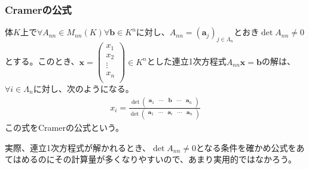 \documentclass[dvipdfmx]{jsarticle}
\begin{document}
\subsubsection{Cramerの公式}%
\begin{thm}[Cramerの公式]\label{2.1.11.16}
体$K$上で$\forall A_{nn} \in M_{nn}(K)\forall\mathbf{b} \in K^{n}$に対し、$A_{nn} = \left( \mathbf{a}_{j} \right)_{j \in \varLambda_{n}}$とおき$\det A_{nn} \neq 0$とする。このとき、$\mathbf{x} = \begin{pmatrix}
x_{1} \\
x_{2} \\
 \vdots \\
x_{n} \\
\end{pmatrix} \in K^{n}$とした連立1次方程式$A_{nn}\mathbf{x} = \mathbf{b}$の解は、$\forall i \in \varLambda_{n}$に対し、次のようになる。
\begin{align*}
x_{i} = \frac{\det\begin{pmatrix}
\mathbf{a}_{1} & \cdots & \mathbf{b} & \cdots & \mathbf{a}_{n} \\
\end{pmatrix}}{\det\begin{pmatrix}
\mathbf{a}_{1} & \cdots & \mathbf{a}_{i} & \cdots & \mathbf{a}_{n} \\
\end{pmatrix}}
\end{align*}
この式をCramerの公式という。
\end{thm}\par
実際、連立1次方程式が解かれるとき、$\det A_{nn} \neq 0$となる条件を確かめ公式をあてはめるのにその計算量が多くなりやすいので、あまり実用的ではなかろう。
\end{document}
